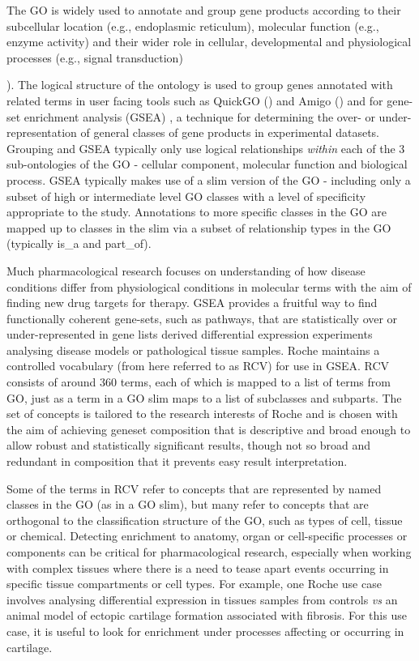 \documentclass[runningheads,a4paper]{llncs}
\begin{document}
The \acf{GO} is widely used to annotate and group gene products according to their subcellular location (e.g., endoplasmic reticulum), molecular function (e.g., enzyme activity) and their wider role in cellular, developmental and physiological processes (e.g., signal transduction) {\cite{GO2015}). The logical structure of the ontology is used to group genes annotated with related terms in user facing tools such as QuickGO () and Amigo () and for gene-set enrichment analysis (GSEA) \cite{Merico2010} %
, a technique for determining the over- or under-representation of general classes of gene products in experimental datasets. Grouping and GSEA typically only use logical relationships \textit{within} each of the 3 sub-ontologies of the \ac{GO} - cellular component, molecular function and biological process.  GSEA typically makes use of a slim version of the GO - including only a subset of high or intermediate level GO classes with a level of specificity appropriate to the study.  Annotations to more specific classes in the GO are mapped up to classes in the slim via a subset of relationship types in the GO (typically is\_a and part\_of).

Much pharmacological research focuses on understanding of how disease conditions differ from physiological conditions in molecular terms with the aim of finding new drug targets for therapy. GSEA provides a fruitful way to find functionally coherent gene-sets, such as pathways, that are statistically over or under-represented in gene lists derived differential expression experiments analysing disease models or pathological tissue samples.  Roche maintains a controlled vocabulary (from here referred to as RCV) for use in GSEA.  RCV consists of around 360 terms, each of which is mapped to a list of terms from GO, just as a term in a GO slim maps to a list of subclasses and subparts. The set of concepts is tailored to the research interests of Roche and is chosen with the aim of achieving geneset composition that is descriptive and broad enough to allow robust and statistically significant results, though not so broad and redundant in composition that it prevents easy result interpretation.

Some of the terms in RCV refer to concepts that are represented by named classes in the GO (as in a GO slim), but many refer to concepts that are orthogonal to the classification structure of the GO, such as types of cell, tissue or chemical.  Detecting enrichment to anatomy, organ or cell-specific processes or components can be critical for pharmacological research, especially when working with complex tissues where there is a need to tease apart events occurring in specific tissue compartments or cell types. For example, one Roche use case involves analysing differential expression in tissues samples from controls \textit{vs} an animal model of ectopic cartilage formation associated with fibrosis.  For this use case, it is useful to look for enrichment under processes affecting or occurring in cartilage.

}
\end{document}
